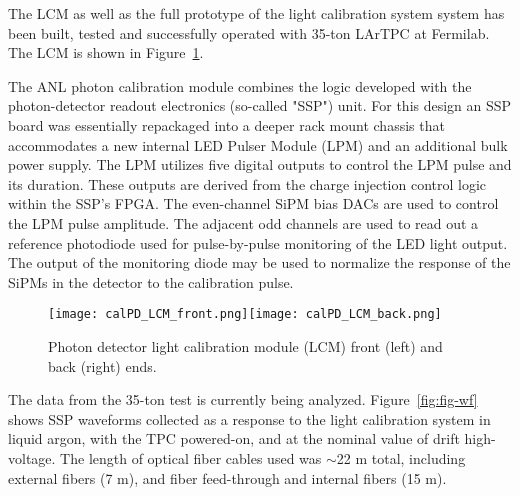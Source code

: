 The LCM as well as the full prototype of the light calibration system system has been built, tested and successfully operated with 35-ton LArTPC at Fermilab. The LCM is shown in Figure~\ref{fig:fig-c-3}. 

The ANL photon calibration module  combines the logic developed with the photon-detector readout electronics (so-called "SSP") unit.  
For this design an SSP board was essentially repackaged into a deeper rack mount 
chassis  that accommodates a new internal LED Pulser Module (LPM) and an additional bulk power supply. The LPM utilizes five digital outputs to control the LPM pulse and its duration.  
These outputs are derived from the charge injection control logic within the SSP's FPGA.  The even-channel SiPM bias DACs  are used to control the LPM pulse amplitude.  
The adjacent odd channels are used to read out a reference photodiode used for pulse-by-pulse monitoring of the LED light output.  The output of the monitoring diode may be used to normalize 
the response of the SiPMs in the detector to the calibration pulse.

%
 \begin{figure}[h]
  \centering
\texttt{[image: calPD\_LCM\_front.png]}\texttt{[image: calPD\_LCM\_back.png]}
\caption{Photon detector light calibration module (LCM) front (left) and back (right) ends.}
\label{fig:fig-c-3}
\end{figure}


The data from the 35-ton test is currently being analyzed. %
Figure~\ref{fig:fig-wf} shows SSP waveforms collected as a response to the light calibration system %
in liquid argon, with the TPC powered-on, and at the nominal value of drift high-voltage.  
The length of optical fiber cables used %
was $\sim$22 m total, including external fibers (7 m), and fiber feed-through and internal fibers (15 m).

